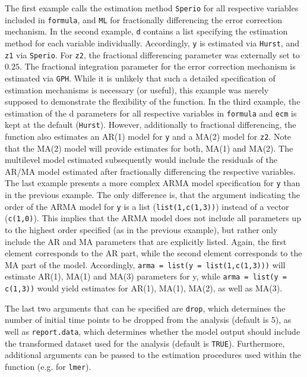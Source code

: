 \documentclass[12pt]{paper}\usepackage[]{graphicx}\usepackage[]{color}
\begin{document}
The first example calls the estimation method \texttt{Sperio} for all respective variables included in \texttt{formula}, and \texttt{ML} for fractionally differencing the error correction mechanism. In the second example, \texttt{d} contains a list specifying the estimation method for each variable individually. Accordingly, \texttt{y} is estimated via \texttt{Hurst}, and \texttt{z1} via \texttt{Sperio}. For \texttt{z2}, the fractional differencing parameter was externally set to $0.25$. The fractional integration parameter for the error correction mechanism is estimated via \texttt{GPH}. While it is unlikely that such a detailed specification of estimation mechanisms is necessary (or useful), this example was merely supposed to demonstrate the flexibility of the function. In the third example, the estimation of the d parameters for all respective variables in \texttt{formula} and \texttt{ecm} is kept at the default (\texttt{Hurst}). However, additionally to fractional differencing, the function also estimates an AR(1) model for \texttt{y} and a MA(2) model for \texttt{z2}. Note that the MA(2) model will provide estimates for both, MA(1) and MA(2). The multilevel model estimated subsequently would include the residuals of the AR/MA model estimated after fractionally differencing the respective variables. The last example presents a more complex ARMA model specification for \texttt{y} than in the previous example. The only difference is, that the argument indicating the order of the ARMA model for \texttt{y} is a list (\texttt{list(1,c(1,3))}) instead of a vector (\texttt{c(1,0)}). This implies that the ARMA model does not include all parameters up to the highest order specified (as in the previous example), but rather only include the AR and MA parameters that are explicitly listed. Again, the first element corresponds to the AR part, while the second element corresponds to the MA part of the model. Accordingly, \texttt{arma = list(y = list(1,c(1,3)))} will estimate AR(1), MA(1) and MA(3) parameters for y, while \texttt{arma = list(y = c(1,3))} would yield estimates for AR(1), MA(1), MA(2), as well as MA(3).

The last two arguments that can be specified are \texttt{drop}, which determines the number of initial time points to be dropped from the analysis (default is 5), as well as \texttt{report.data}, which determines whether the model output should include the transformed dataset used for the analysis (default is \texttt{TRUE}). Furthermore, additional arguments can be passed to the estimation procedures used within the function (e.g. for \texttt{lmer}).
\end{document}
